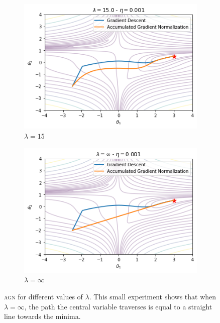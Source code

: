 \begin{figure}[H]
  \centering
  \begin{subfigure}{.49\textwidth}
    \centering
    \includegraphics[width=\linewidth]{resources/images/agn_straight_line_1}
    \caption{$\lambda = 15$}
  \end{subfigure}
  \begin{subfigure}{.49\textwidth}
    \centering
    \includegraphics[width=\linewidth]{resources/images/agn_straight_line_2}
    \caption{$\lambda = \infty$}
  \end{subfigure}
  \caption{\textsc{agn} for different values of $\lambda$. This small experiment shows that when $\lambda = \infty$, the path the central variable traverses is equal to a straight line towards the minima.}
  \label{fig:agn_straight_line}
\end{figure}

